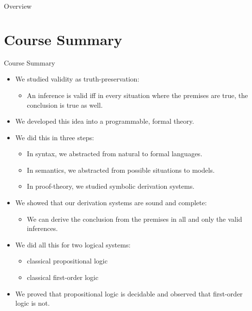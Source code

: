 \setcounter{framenumber}{372}
\begin{frame}
	\maketitle
\end{frame}

\begin{frame}{Overview}
\tableofcontents
\end{frame}

\section{Course Summary}
\begin{frame}{Course Summary}
	
  \begin{itemize}

    \item We studied validity as truth-preservation:
      \begin{itemize}
      \item An inference is valid iff in every situation where the
        premises are true, the conclusion is true as well.
      \end{itemize}
      \item We developed this idea into a programmable, formal theory.
      \item We did this in three steps:
        \begin{itemize}
        \item In syntax, we abstracted from natural to formal
          languages.
        \item In semantics, we abstracted from possible situations to models.
          
            \item In proof-theory, we studied symbolic derivation systems.
            \end{itemize}
              \item We showed that our derivation systems are sound
                and complete:
                \begin{itemize}
                \item We can derive the conclusion from the premises
                  in all and only the valid inferences.
                \end{itemize}
                \item We did all this for two logical systems:
            \begin{itemize}
            \item classical propositional logic
              \item classical first-order logic
              \end{itemize}
                \item We proved that propositional logic is decidable
                  and observed that first-order logic is not.
										
	\end{itemize}

\end{frame}

